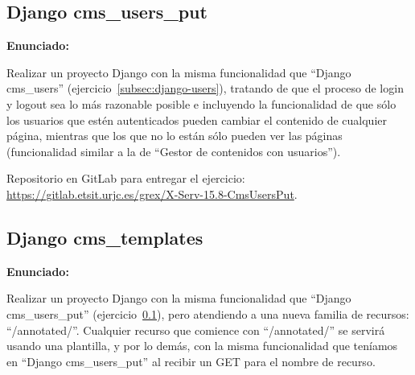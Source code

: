 

\subsection{Django cms\_users\_put}
\label{subsec:django-users-put}

\textbf{Enunciado:}

Realizar un proyecto Django con la misma funcionalidad que ``Django cms\_users'' (ejercicio~\ref{subsec:django-users}), tratando de que el proceso de login y logout sea lo más razonable posible e incluyendo la funcionalidad de que sólo los usuarios que estén autenticados pueden cambiar el contenido de cualquier página, mientras que los que no lo están sólo pueden ver las páginas (funcionalidad similar a la de ``Gestor de contenidos con usuarios'').

Repositorio en GitLab para entregar el ejercicio: \\ 
\url{https://gitlab.etsit.urjc.es/grex/X-Serv-15.8-CmsUsersPut}.


\subsection{Django cms\_templates}
\label{subsec:django-templates}

\textbf{Enunciado:}

Realizar un proyecto Django con la misma funcionalidad que ``Django cms\_users\_put'' (ejercicio~\ref{subsec:django-users-put}), pero atendiendo a una nueva familia de recursos: ``/annotated/''. Cualquier recurso que comience con ``/annotated/'' se servirá usando una plantilla, y por lo demás, con la misma funcionalidad que teníamos en ``Django cms\_users\_put'' al recibir un GET para el nombre de recurso.


